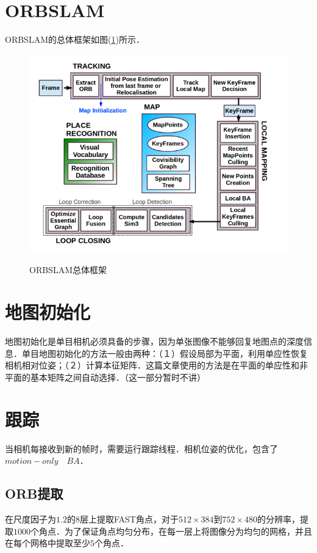 \documentclass{article}
\begin{document}
\tableofcontents
\newpage

\section{ORBSLAM}
ORBSLAM的总体框架如图(\ref{fig:orbslam_overview})所示．
\begin{figure}
	\centering
	\includegraphics[width=14cm]{images/orbslam_overview.png}
	\label{fig:orbslam_overview}
	\caption{ORBSLAM总体框架}
\end{figure}

\section{地图初始化}
地图初始化是单目相机必须具备的步骤，因为单张图像不能够回复地图点的深度信息．单目地图初始化的方法一般由两种：（１）假设局部为平面，利用单应性恢复相机相对位姿；（２）计算本征矩阵．这篇文章使用的方法是在平面的单应性和非平面的基本矩阵之间自动选择．（这一部分暂时不讲）

\section{跟踪}
当相机每接收到新的帧时，需要运行跟踪线程．相机位姿的优化，包含了$motion-only \quad BA$．
\subsection{ORB提取}
在尺度因子为$1.2$的$8$层上提取FAST角点，对于$512\times 384$到$752\times 480$的分辨率，提取$1000$个角点．为了保证角点均匀分布，在每一层上将图像分为均匀的网格，并且在每个网格中提取至少$5$个角点．
\end{document}
